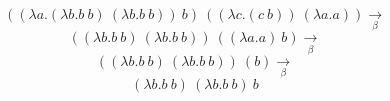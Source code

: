 \documentclass[12pt]{article}
\begin{document}
	$$((\lambda a.(\lambda b.b\ b)\ (\lambda b.b\ b))\ b)\ ((\lambda c.(c\ b))\ (\lambda a.a))\underset{\beta}{\to}$$
	$$ ((\lambda b.b\ b)\ (\lambda b. b\ b))\ ((\lambda a.a)\ b) \underset{\beta}{\to}$$
	$$((\lambda b.b\ b)\ (\lambda b.b\ b))\ (b) \underset{\beta}{\to}$$
	$$(\lambda b.b\ b)\ (\lambda b.b\ b)\ b $$
\end{document}
